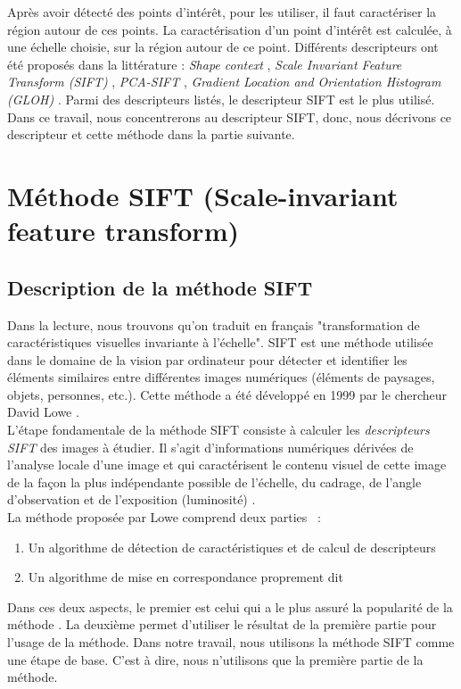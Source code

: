 Après avoir détecté des points d'intérêt, pour les utiliser, il faut caractériser la région autour de ces points. La caractérisation d'un point d'intérêt est calculée, à une échelle choisie, sur la région autour de ce point. Différents descripteurs ont été proposés dans la littérature : \textit{Shape context} \cite{bmp02}, \textit{Scale Invariant Feature Transform (SIFT)} \cite{low04}, \textit{PCA-SIFT} \cite{ks04}, \textit{Gradient Location and Orientation Histogram (GLOH)} \cite{ms05}. Parmi des descripteurs listés, le descripteur SIFT est le plus utilisé. Dans ce travail, nous concentrerons au descripteur SIFT, donc, nous décrivons ce descripteur et cette méthode dans la partie suivante.

\section{Méthode SIFT (Scale-invariant feature transform)}
\subsection{Description de la méthode SIFT}
Dans la lecture, nous trouvons qu'on traduit en français "transformation de caractéristiques visuelles invariante à l'échelle". SIFT est une méthode utilisée dans le domaine de la vision par ordinateur pour détecter et identifier les éléments similaires entre différentes images numériques (éléments de paysages, objets, personnes, etc.). Cette méthode a été développé en 1999 par le chercheur David Lowe \cite{low99}.\\

L'étape fondamentale de la méthode SIFT consiste à calculer les \textit{descripteurs SIFT} des images à étudier. Il s'agit d'informations numériques dérivées de l'analyse locale d'une image et qui caractérisent le contenu visuel de cette image de la façon la plus indépendante possible de l'échelle, du cadrage, de l'angle d'observation et de l'exposition (luminosité) \cite{low99}.\\

La méthode proposée par Lowe comprend deux parties \cite{low04}~:
\begin{enumerate}
\item Un algorithme de détection de caractéristiques et de calcul de descripteurs
\item Un algorithme de mise en correspondance proprement dit
\end{enumerate}

Dans ces deux aspects, le premier est celui qui a le plus assuré la popularité de la méthode \cite{mt10}. La deuxième permet d'utiliser le résultat de la première partie pour l'usage de la méthode. Dans notre travail, nous utilisons la méthode SIFT comme une étape de base. C'est à dire, nous n'utilisons que la première partie de la méthode.\\

